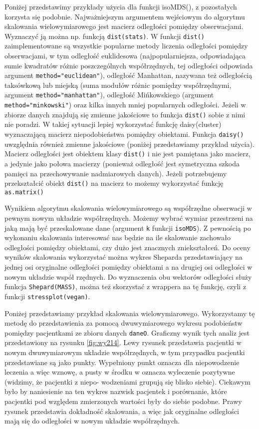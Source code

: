 \documentclass[polish,]{book}
\begin{document}
Poniżej przedstawimy przykłady użycia dla funkcji isoMDS(), z pozostałych korzysta
się podobnie. Najważniejszym argumentem wejściowym do algorytmu skalowania wielowymiarowego jest macierz odległości pomiędzy obserwacjami. Wyznaczyć ją można np. funkcją \texttt{dist(stats)}. W funkcji \texttt{dist()} zaimplementowane są wszystkie
popularne metody liczenia odległości pomiędzy obserwacjami, w tym odległość euklidesowa (najpopularniejsza, odpowiadająca sumie kwadratów różnic poszczególnych współrzędnych, tej odległości odpowiada argument \texttt{method="euclidean"}), odległość Manhattan, nazywana też odległością taksówkową lub miejską (suma modułów różnic pomiędzy współrzędnymi, argument \texttt{method="manhattan"}), odległość Mińkowskiego (argument \texttt{method="minkowski"})
oraz kilka innych mniej popularnych odległości. Jeżeli w zbiorze danych znajdują się
zmienne jakościowe to funkcja \texttt{dist()} sobie z nimi nie poradzi. W takiej sytuacji
lepiej wykorzystać funkcję daisy(cluster) wyznaczającą macierz niepodobieństwa
pomiędzy obiektami. Funkcja \texttt{daisy()} uwzględnia również zmienne jakościowe (poniżej przedstawiamy przykład użycia). Macierz odległości jest obiektem klasy \texttt{dist()}
i nie jest pamiętana jako macierz, a jedynie jako połowa macierzy (ponieważ odległość jest symetryczna szkoda pamięci na przechowywanie nadmiarowych danych).
Jeżeli potrzebujemy przekształcić obiekt \texttt{dist()} na macierz to możemy wykorzystać
funkcję \texttt{as.matrix()}

Wynikiem algorytmu skalowania wielowymiarowego są współrzędne obserwacji
w pewnym nowym układzie współrzędnych. Możemy wybrać wymiar przestrzeni na
jaką mają być przeskalowane dane (argument \texttt{k} funkcji \texttt{isoMDS}). Z pewnością po wykonaniu skalowania interesować nas będzie na ile skalowanie zachowało odległości pomiędzy obiektami, czy dużo jest znacznych zniekształceń. Do oceny wyników skalowania wykorzystać można wykres Sheparda przedstawiający na jednej osi oryginalne
odległości pomiędzy obiektami a na drugiej osi odległości w nowym układzie współ
rzędnych. Do wyznaczenia obu wektorów odległości służy funkcja \texttt{Shepard(MASS)},
można też skorzystać z wrappera na tę funkcję, czyli z funkcji \texttt{stressplot(vegan)}.

Poniżej przedstawiamy przykład skalowania wielowymiarowego. Wykorzystamy
tę metodę do przedstawienia za pomocą dwuwymiarowego wykresu podobieństw
pomiędzy pacjentkami ze zbioru danych \texttt{daneO}. Graficzny wynik tych analiz jest
przedstawiony na rysunku \ref{fig:wy214}. Lewy rysunek przedstawia pacjentki w nowym dwuwymiarowym układzie współrzędnych, w tym przypadku pacjentki przedstawiane są
jako punkty. Wypełniony punkt oznacza dla niepowodzenie leczenia a więc wznowę,
a pusty w środku w oznacza wyleczenie pozytywne (widzimy, że pacjentki z niepo-
wodzeniami grupują się blisko siebie). Ciekawym było by naniesienie na ten wykres
nazwisk pacjentek i porównanie, które pacjentki pod względem zmierzonych wartości
były do siebie podobne. Prawy rysunek przedstawia dokładność skalowania, a więc
jak oryginalne odległości mają się do odległości w nowym układzie współrzędnych.
\end{document}
